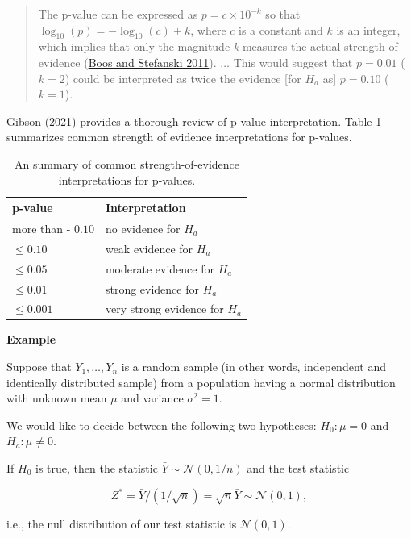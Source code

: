 \documentclass[
]{book}
\theoremstyle{definition}
\theoremstyle{definition}
\theoremstyle{definition}
\theoremstyle{definition}
\theoremstyle{remark}
\begin{document}
\begin{quote}
The p-value can be expressed as \(p=c\times 10^{-k}\) so that
\(\log_{10}(p)=-\log_{10}(c)+k\), where \(c\) is a constant and \(k\) is an
integer, which implies that only the magnitude \emph{k} measures the actual
strength of evidence (\protect\hyperlink{ref-boos_stefanski_2011_pvalues}{Boos and Stefanski 2011}). \(\ldots\) This
would suggest that \(p=0.01\) (\(k=2\)) could be interpreted as twice the
evidence {[}for \(H_a\) as{]} \(p=0.10\) (\(k=1\)).
\end{quote}

Gibson (\protect\hyperlink{ref-gibson_pvalue}{2021}) provides a thorough review of p-value interpretation.
Table \ref{tab:pvalue-interp} summarizes common strength of evidence
interpretations for p-values.

\begin{table}

\caption{\label{tab:pvalue-interp}An summary of common strength-of-evidence interpretations for p-values.}
\centering
\begin{tabular}[t]{l>{\raggedright\arraybackslash}p{3in}}
\toprule
p-value & Interpretation\\
\midrule
more than -
                              $0.10$ & no evidence for $H_a$\\
$\leq 0.10$ & weak evidence for $H_a$\\
$\leq 0.05$ & moderate evidence for $H_a$\\
$\leq 0.01$ & strong evidence for $H_a$\\
$\leq 0.001$ & very strong evidence for $H_a$\\
\bottomrule
\end{tabular}
\end{table}

\textbf{Example}

Suppose that \(Y_1,\ldots,Y_n\) is a random sample (in other words,
independent and identically distributed sample) from a population having
a normal distribution with unknown mean \(\mu\) and variance \(\sigma^2=1\).

We would like to decide between the following two hypotheses:
\(H_0:\mu=0\) and \(H_a:\mu\neq 0\).

If \(H_0\) is true, then the statistic \(\bar{Y}\sim \mathcal{N}(0,1/n)\) and
the test statistic

\[
Z^*=\bar{Y}/(1/\sqrt{n})=\sqrt{n}\bar{Y}\sim \mathcal{N}(0, 1),
\]

i.e., the null distribution of our test statistic is \(\mathcal{N}(0,1)\).
\end{document}
